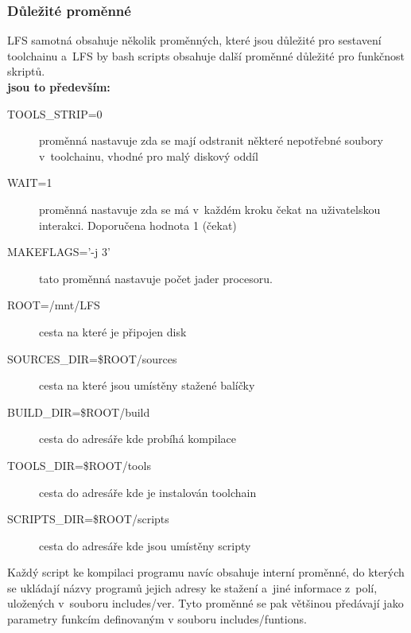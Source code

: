 \documentclass[a4paper,12pt]{article}
\renewcommand{\b}[1]{\textbf{#1}} %
\begin{document}
\subsubsection{Důležité proměnné}
LFS samotná obsahuje několik proměnných, které jsou důležité pro sestavení toolchainu a~LFS by bash scripts obsahuje další proměnné důležité pro funkčnost skriptů.\\

\b{jsou to především:}
\begin{description}
 \item[TOOLS\_STRIP=0] proměnná nastavuje zda se mají odstranit některé nepotřebné soubory v~toolchainu, vhodné pro malý diskový oddíl
 \item[WAIT=1] proměnná nastavuje zda se má v~každém kroku čekat na uživatelskou interakci. Doporučena hodnota 1 (čekat)
 \item[MAKEFLAGS='-j 3'] tato proměnná nastavuje počet jader procesoru.
 \item[ROOT=/mnt/LFS] cesta na které je připojen disk
 \item[SOURCES\_DIR=\$ROOT/sources] cesta na které jsou umístěny stažené balíčky
 \item[BUILD\_DIR=\$ROOT/build] cesta do adresáře kde probíhá kompilace
 \item[TOOLS\_DIR=\$ROOT/tools] cesta do adresáře kde je instalován toolchain
 \item[SCRIPTS\_DIR=\$ROOT/scripts] cesta do adresáře kde jsou umístěny scripty
 \end{description}

Každý script ke kompilaci programu navíc obsahuje interní proměnné, do kterých se ukládají názvy programů jejich adresy ke stažení a~jiné informace z~polí, uložených v~souboru includes/ver. Tyto proměnné se pak většinou předávají jako parametry funkcím definovaným v souboru includes/funtions.\\
\end{document}
